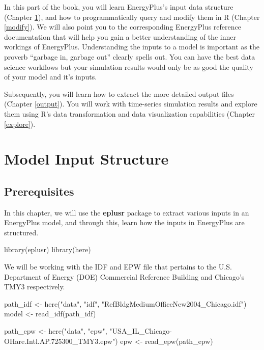 \documentclass[
]{book}
\newenvironment{Shaded}{\begin{snugshade}}{\end{snugshade}}
\newcommand{\FunctionTok}[1]{\textcolor[rgb]{0.00,0.00,0.00}{#1}}
\newcommand{\NormalTok}[1]{#1}
\newcommand{\OtherTok}[1]{\textcolor[rgb]{0.56,0.35,0.01}{#1}}
\newcommand{\StringTok}[1]{\textcolor[rgb]{0.31,0.60,0.02}{#1}}
\begin{document}
In this part of the book, you will learn EnergyPlus's input data structure (Chapter \ref{input}), and how to programmatically query and modify them in R (Chapter \ref{modify}). We will also point you to the corresponding EnergyPlus reference documentation that will help you gain a better understanding of the inner workings of EnergyPlus. Understanding the inputs to a model is important as the proverb ``garbage in, garbage out'' clearly spells out. You can have the best data science workflows but your simulation results would only be as good the quality of your model and it's inputs.

Subsequently, you will learn how to extract the more detailed output files (Chapter \ref{output}). You will work with time-series simulation results and explore them using R's data transformation and data visualization capabilities (Chapter \ref{explore}).

\hypertarget{input}{%
\chapter{Model Input Structure}\label{input}}

\hypertarget{prerequisites-10}{%
\section{Prerequisites}\label{prerequisites-10}}

In this chapter, we will use the \textbf{eplusr} package to extract various inputs in an EnergyPlus model, and through this, learn how the inputs in EnergyPlus are structured.

\begin{Shaded}
\begin{Highlighting}[]
\FunctionTok{library}\NormalTok{(eplusr)}
\FunctionTok{library}\NormalTok{(here)}
\end{Highlighting}
\end{Shaded}

We will be working with the IDF and EPW file that pertains to the U.S. Department of Energy (DOE) Commercial Reference Building and Chicago's TMY3 respectively.

\begin{Shaded}
\begin{Highlighting}[]
\NormalTok{path\_idf }\OtherTok{\textless{}{-}} \FunctionTok{here}\NormalTok{(}\StringTok{"data"}\NormalTok{, }\StringTok{"idf"}\NormalTok{, }\StringTok{"RefBldgMediumOfficeNew2004\_Chicago.idf"}\NormalTok{)}
\NormalTok{model }\OtherTok{\textless{}{-}} \FunctionTok{read\_idf}\NormalTok{(path\_idf)}

\NormalTok{path\_epw }\OtherTok{\textless{}{-}} \FunctionTok{here}\NormalTok{(}\StringTok{"data"}\NormalTok{, }\StringTok{"epw"}\NormalTok{, }\StringTok{"USA\_IL\_Chicago{-}OHare.Intl.AP.725300\_TMY3.epw"}\NormalTok{)}
\NormalTok{epw }\OtherTok{\textless{}{-}} \FunctionTok{read\_epw}\NormalTok{(path\_epw)}
\end{Highlighting}
\end{Shaded}
\end{document}
